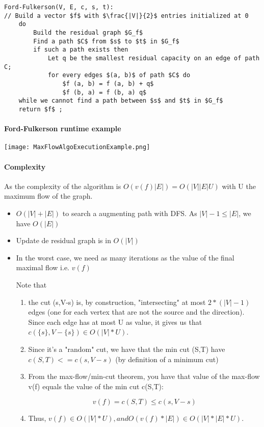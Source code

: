 \begin{lstlisting}[mathescape]
Ford-Fulkerson(V, E, c, s, t):
// Build a vector $f$ with $\frac{|V|}{2}$ entries initialized at 0
    do
        Build the residual graph $G_f$ 
        Find a path $C$ from $s$ to $t$ in $G_f$ 
        if such a path exists then
            Let q be the smallest residual capacity on an edge of path C;
            for every edges $(a, b)$ of path $C$ do
                $f (a, b) = f (a, b) + q$
                $f (b, a) = f (b, a) q$
    while we cannot find a path between $s$ and $t$ in $G_f$ 
    return $f$ ;
\end{lstlisting}

\paragraph{Ford-Fulkerson runtime example}
\begin{center}
    \texttt{[image: MaxFlowAlgoExecutionExample.png]}
\end{center}

\paragraph{Complexity}
As the complexity of the algorithm is $O(v(f) |E|) = O(|V| |E| U)$ with U the
maximum flow of the graph. 

\begin{itemize}
    \item $O(|V|+|E|)$ to search a augmenting path with DFS. As $|V| - 1
        \leq |E|$, we have $O(|E|)$
    \item Update de residual graph is in $O(|V|)$
    \item In the worst case, we need as many iterations as the value of
        the final maximal flow i.e. $v(f)$

        Note that
        \begin{enumerate}
            \item
                the cut ({s},V-{s}) is, by construction, "intersecting"
                at most $2*(|V|-1)$ edges (one for each vertex that are
                not the source and the direction). Since each edge has
                at most U as value, it gives us that $c(\{s\},V-\{s\}) \in
                O(|V|*U)$.

            \item Since it's a "random" cut, we have that the min cut
                (S,T) have $c(S,T) <= c({s},V-{s})$ (by definition of a
                minimum cut)

            \item From the max-flow/min-cut theorem, you have that value
                of the max-flow v(f) equals the value of the min cut
                c(S,T):

                $$v(f) = c(S,T) \leq c({s},V-{s})$$

                \item Thus, $v(f) \in O(|V|*U), and O(v(f)*|E|) \in
                O(|V|*|E|*U)$.
        \end{enumerate}
\end{itemize}

